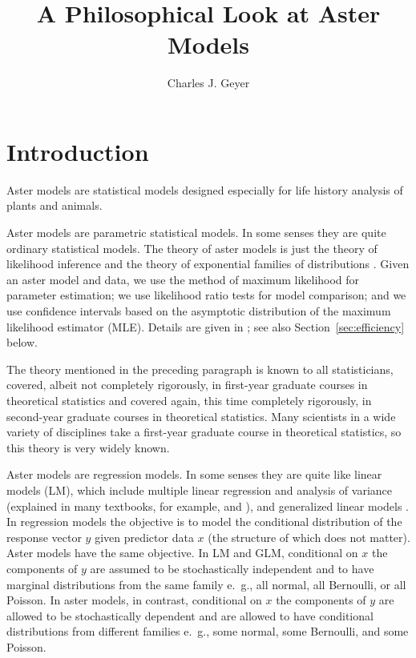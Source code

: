\documentclass[11pt]{article}
\begin{document}
\title{A Philosophical Look at Aster Models}
\author{Charles J. Geyer}
\maketitle

\section{Introduction} \label{sec:intro}

Aster models \citep*{aster1,aster2,reaster} are statistical models designed
especially
for life history analysis of plants and animals.

Aster models are parametric statistical models.  In some senses they are
quite ordinary statistical models.  The theory of aster models is just
the theory of likelihood inference \citep{fisher1922,severini} and
the theory of exponential families of distributions
\citep{barndorff-nielsen,brown,geyer-thesis}.
Given an aster model and data, we use the method
of maximum likelihood for parameter estimation; we use likelihood ratio
tests for model comparison; and we use confidence intervals based on
the asymptotic distribution of the maximum likelihood estimator (MLE).
Details are given in \citet {aster1};
see also Section~\ref{sec:efficiency} below.

The theory mentioned in the preceding paragraph is known to all statisticians,
covered, albeit not completely rigorously, in first-year graduate courses in
theoretical statistics and covered again, this time completely rigorously,
in second-year graduate courses in theoretical statistics.  Many scientists
in a wide variety of disciplines take a first-year graduate course in
theoretical statistics, so this theory is very widely known.

Aster models are regression models.  In some senses they are
quite like linear models (LM), which include multiple linear regression
and analysis of variance (explained in many textbooks, for example,
\citealp{weisberg} and \citealp{oehlert}), and generalized
linear models \citep[GLM;][]{mccullagh-nelder}.
In regression models the objective
is to model the conditional distribution of the response vector $y$ given
predictor data $x$ (the structure of which does not matter).
Aster models have the same objective.  In LM and GLM, conditional on $x$
the components of $y$ are assumed to be stochastically
independent and to have marginal distributions from the same family
e.~g., all normal, all Bernoulli, or all Poisson.
In aster models, in contrast, conditional on $x$
the components of $y$ are allowed to be stochastically dependent and are
allowed to have conditional distributions from different families
e.~g., some normal, some Bernoulli, and some Poisson.
\end{document}
